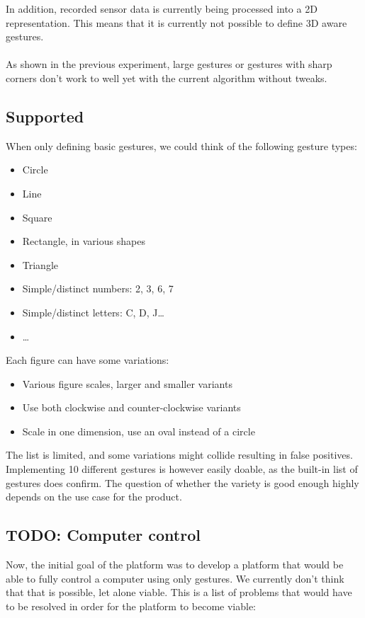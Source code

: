 \documentclass[a4paper]{article}
\providecommand{\tightlist}{%
\setlength{\itemsep}{0pt}\setlength{\parskip}{0pt}}
\begin{document}
  In addition, recorded sensor data is currently being processed into a 2D
  representation. This means that it is currently not possible to define 3D
  aware gestures.

  \paragraph{}
  As shown in the previous experiment, large gestures or gestures with sharp
  corners don't work to well yet with the current algorithm without tweaks.

  \subsection*{Supported}
  When only defining basic gestures, we could think of the following gesture
  types:

  \begin{itemize}
    \tightlist
    \item Circle
    \item Line
    \item Square
    \item Rectangle, in various shapes
    \item Triangle
    \item Simple/distinct numbers: 2, 3, 6, 7
    \item Simple/distinct letters: C, D, J\dots
    \item \dots
  \end{itemize}

  Each figure can have some variations:
  \begin{itemize}
    \tightlist
    \item Various figure scales, larger and smaller variants
    \item Use both clockwise and counter-clockwise variants
    \item Scale in one dimension, use an oval instead of a circle
  \end{itemize}

  The list is limited, and some variations might collide resulting in false
  positives. Implementing 10 different gestures is however easily doable, as the
  built-in list of gestures does confirm. The question of whether the variety is
  good enough highly depends on the use case for the product.

  \subsection*{TODO: Computer control}
  Now, the initial goal of the platform was to develop a platform that would be
  able to fully control a computer using only gestures. We currently don't think
  that that is possible, let alone viable. This is a list of problems that would
  have to be resolved in order for the platform to become viable:
\end{document}
